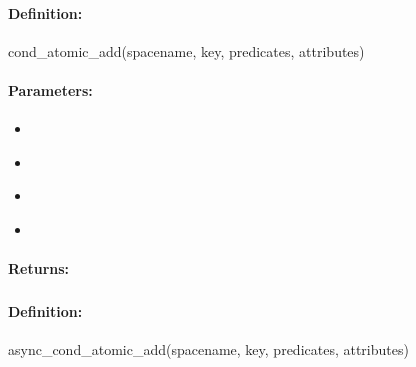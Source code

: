 \paragraph{Definition:}
\begin{rubycode}
cond_atomic_add(spacename, key, predicates, attributes)
\end{rubycode}

\paragraph{Parameters:}
\begin{itemize}[noitemsep]
\item {}\\

\item {}\\

\item {}\\

\item {}\\

\end{itemize}

\paragraph{Returns:}


\pagebreak
\subsubsection{}
\label{api:ruby:async_cond_atomic_add}


\paragraph{Definition:}
\begin{rubycode}
async_cond_atomic_add(spacename, key, predicates, attributes)
\end{rubycode}

